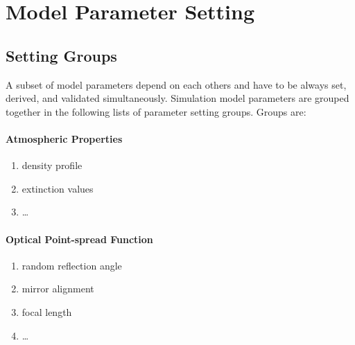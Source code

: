 \section{Model Parameter Setting}
\label{sect:ModelParameterSetting}

\subsection{Setting Groups}

A subset of model parameters depend on each others and have to be always set, derived, and validated simultaneously.
Simulation model parameters are grouped together in the following lists of parameter setting groups.
Groups are:

\paragraph{Atmospheric Properties} \label{settingGroup:AtmosphericProperties}
    \begin{enumerate}
        \item density profile
        \item extinction values
        \item \dots
    \end{enumerate}
    
\paragraph{Optical Point-spread Function} \label{settingGroup:opticalPSF}
    \begin{enumerate}
        \item random reflection angle
        \item mirror alignment
        \item focal length
        \item \dots
    \end{enumerate}
    
